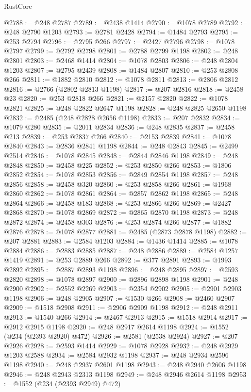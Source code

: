 \begin{lexlean}{RustCore}
\begin{coremodule}
@2788 := @248 @2787
@2789 := @2438 @1414
@2790 := @1078 @2789
@2792 := @248 @2790 @1203
@2793 := @2781 @2428
@2794 := @1484 @2793
@2795 := @253 @2794
@2796 := @2795 @266
@2797 := @2427 @2796
@2798 := @1078 @2797
@2799 := @2792 @2798
@2801 := @2788 @2799 @1198
@2802 := @248 @2801
@2803 := @2468 @1414
@2804 := @1078 @2803
@2806 := @248 @2804 @1203
@2807 := @2795 @2439
@2808 := @1484 @2807
@2810 := @253 @2808 @266
@2811 := @1882 @2810
@2812 := @1078 @2811
@2813 := @2806 @2812
@2816 := @2766 (@2802 @2813 @1198)
@2817 := @207 @2816
@2818 := @2458 @23
@2820 := @253 @2818 @266
@2821 := @2157 @2820
@2822 := @1078 @2821
@2825 := @248 @2822 @2647 @1198
@2828 := @248 @2825 @2650 @1198
@2832 := @2485 (@248 @2828 @2656 @1198)
@2833 := @207 @2832
@2834 := @1079 @280
@2835 := @2011 @2834
@2836 := @248 @2835
@2837 := @2458 @213
@2839 := @253 @2837 @266
@2840 := @2153 @2839
@2841 := @1078 @2840
@2843 := @2836 @2841 @1198
@2844 := @248 @2843
@2845 := @2499 @2514
@2846 := @1078 @2845
@2848 := @2844 @2846 @1198
@2849 := @248 @2848
@2850 := @2458 @225
@2852 := @253 @2850 @266
@2853 := @1806 @2852
@2854 := @1078 @2853
@2856 := @2849 @2854 @1198
@2857 := @248 @2856
@2858 := @2458 @320
@2860 := @253 @2858 @266
@2861 := @1968 @2860
@2862 := @1078 @2861
@2864 := @2857 @2862 @1198
@2865 := @248 @2864
@2866 := @2458 @183
@2868 := @253 @2866 @266
@2869 := @2427 @2868
@2870 := @1078 @2869
@2872 := @2865 @2870 @1198
@2873 := @248 @2872
@2874 := @2458 @303
@2876 := @253 @2874 @266
@2877 := @1882 @2876
@2878 := @1078 @2877
@2881 := @2485 (@2873 @2878 @1198)
@2882 := @207 @2881
@2883 := @2584 @1203
@2884 := @1436 @1414
@2885 := @1078 @2884
@2886 := @2883 @2885
@2887 := @248 @2886
@2889 := @2584 @1257 @1419
@2891 := @253 @2889 @266
@2892 := @377 @2891
@2893 := @1993 @2892
@2895 := @2887 @2893 @1198
@2896 := @248 @2895
@2897 := @2593 @2820
@2898 := @1078 @2897
@2900 := @2896 @2898 @1198
@2901 := @248 @2900
@2902 := @2552 @2269
@2903 := @2354 @2902
@2905 := @2901 @2903 @1198
@2906 := @248 @2905
@2907 := @1530 @266
@2908 := @2460 @2907
@2909 := @1518 @2908
@2911 := @2906 @2909 @1198
@2912 := @248 @2911
@2913 := @1540 @266
@2914 := @2467 @2913
@2915 := @1518 @2914
@2917 := @2912 @2915 @1198
@2920 := @248 @2917 @2614 @1198
@2924 := @1552 (@234 (@2393 @2920) @472)
@2926 := @2581 (@2538 @2924)
@2927 := @207 @2926
@2928 := @2593 @1414
@2929 := @1078 @2928
@2932 := @248 @2929 @1203 @2588
@2934 := @2584 @2932 @1198
@2937 := @248 @2934 @2596 @1198
@2940 := @248 @2937 @2601 @1198
@2943 := @248 @2940 @2606 @1198
@2946 := @248 @2943 @2313 @1198
@2949 := @248 @2946 @2614 @1198
@2953 := @1552 (@234 (@2393 @2949) @472)

\end{coremodule}
\end{lexlean}
